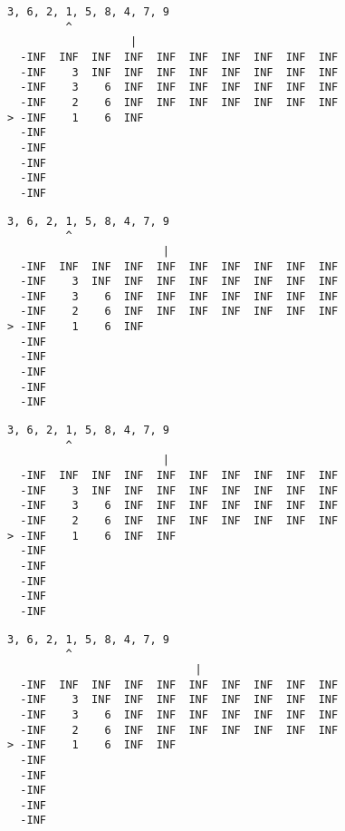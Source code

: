 { \begin{verbatim}
3, 6, 2, 1, 5, 8, 4, 7, 9
         ^
                   |
  -INF  INF  INF  INF  INF  INF  INF  INF  INF  INF
  -INF    3  INF  INF  INF  INF  INF  INF  INF  INF
  -INF    3    6  INF  INF  INF  INF  INF  INF  INF
  -INF    2    6  INF  INF  INF  INF  INF  INF  INF
> -INF    1    6  INF                              
  -INF                                             
  -INF                                             
  -INF                                             
  -INF                                             
  -INF                                             
\end{verbatim} }

{ \begin{verbatim}
3, 6, 2, 1, 5, 8, 4, 7, 9
         ^
                        |
  -INF  INF  INF  INF  INF  INF  INF  INF  INF  INF
  -INF    3  INF  INF  INF  INF  INF  INF  INF  INF
  -INF    3    6  INF  INF  INF  INF  INF  INF  INF
  -INF    2    6  INF  INF  INF  INF  INF  INF  INF
> -INF    1    6  INF                              
  -INF                                             
  -INF                                             
  -INF                                             
  -INF                                             
  -INF                                             
\end{verbatim} }

{ \begin{verbatim}
3, 6, 2, 1, 5, 8, 4, 7, 9
         ^
                        |
  -INF  INF  INF  INF  INF  INF  INF  INF  INF  INF
  -INF    3  INF  INF  INF  INF  INF  INF  INF  INF
  -INF    3    6  INF  INF  INF  INF  INF  INF  INF
  -INF    2    6  INF  INF  INF  INF  INF  INF  INF
> -INF    1    6  INF  INF                         
  -INF                                             
  -INF                                             
  -INF                                             
  -INF                                             
  -INF                                             
\end{verbatim} }

{ \begin{verbatim}
3, 6, 2, 1, 5, 8, 4, 7, 9
         ^
                             |
  -INF  INF  INF  INF  INF  INF  INF  INF  INF  INF
  -INF    3  INF  INF  INF  INF  INF  INF  INF  INF
  -INF    3    6  INF  INF  INF  INF  INF  INF  INF
  -INF    2    6  INF  INF  INF  INF  INF  INF  INF
> -INF    1    6  INF  INF                         
  -INF                                             
  -INF                                             
  -INF                                             
  -INF                                             
  -INF                                             
\end{verbatim} }

